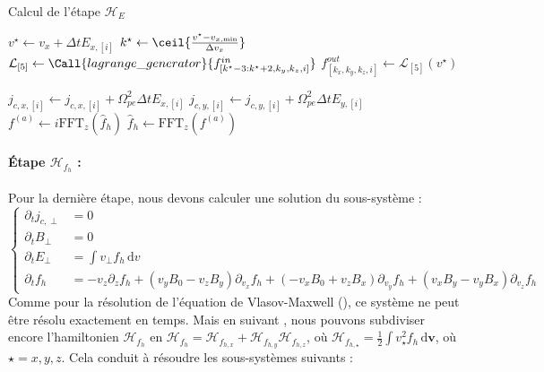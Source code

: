 \begin{algorithm}
  \caption{Calcul de l'étape $\mathcal{H}_{E}$}
  \label{alg:HE}
  \begin{algorithmic}[1]
      \ForAll{$(k_x,k_y,k_z)\in[\![0,N_{v_x}[\![\times[\![0,N_{v_y}[\![\times[\![0,N_{v_z}[\![$}
          \State $v^{\star} \gets v_x + \Delta t E_{x,[i]}$
          \State $k^{\star} \gets \ceil{\frac{ v^{\star}-v_{x,\text{min}} }{ \Delta v_x }}$
          \State $\mathcal{L}_{[5]} \gets \Call{lagrange\_generator}{f^{in}_{[k^\star-3:k^\star+2,k_y,k_z,i]}}$
          \State $f^{out}_{[k_x,k_y,k_z,i]} \gets \mathcal{L}_{[5]}( v^{\star} )$
        \EndFor
      \EndFor
    \EndFunction
      
      \vspace{0.25cm}

        \State $j_{c,x,[i]} \gets j_{c,x,[i]} + \Omega_{pe}^2\Delta t E_{x,[i]}$
        \State $j_{c,y,[i]} \gets j_{c,y,[i]} + \Omega_{pe}^2\Delta t E_{y,[i]}$
      \EndFor
      \State $f^{(a)} \gets i\text{FFT}_z(\hat{f}_h)$ \label{alg:HE:l:ifft}
      \State {}
      \State {}
      \State $\hat{f}_h \gets \text{FFT}_z(f^{(a)})$  \label{alg:HE:l:fft}
    \EndFunction
  \end{algorithmic}
\end{algorithm}

\paragraph{Étape $\mathcal{H}_{f_h}$ :}
Pour la dernière étape, nous devons calculer une solution du sous-système :
$$
  \begin{cases}
    \partial_t  j_{c,\perp} &= 0 \\
    \partial_t B_\perp      &= 0 \\
    \partial_t E_\perp      &= \int v_\perp f_h\,\mathrm{d}v \\
    \partial_t f_h          &= -v_z\partial_zf_h + (v_yB_0-v_zB_y)\partial_{v_x}f_h + (-v_xB_0+v_zB_x)\partial_{v_y}f_h + (v_xB_y - v_yB_x)\partial_{v_z}f_h
  \end{cases}
$$
Comme pour la résolution de l'équation de Vlasov-Maxwell (\cite{Li:2020}), ce système ne peut être résolu exactement en temps. Mais en suivant \cite{Li:2020}, nous pouvons subdiviser encore l'hamiltonien $\mathcal{H}_{f_h}$ en $\mathcal{H}_{f_h}=\mathcal{H}_{f_{h,x}}+\mathcal{H}_{f_{h,y}}\mathcal{H}_{f_{h,z}}$, où $\mathcal{H}_{f_{h,\star}}=\frac{1}{2}\int v_{\star}^2 f_h\,\mathrm{d}\textbf{v}$, où $\star=x,y,z$. Cela conduit à résoudre les sous-systèmes suivants :

